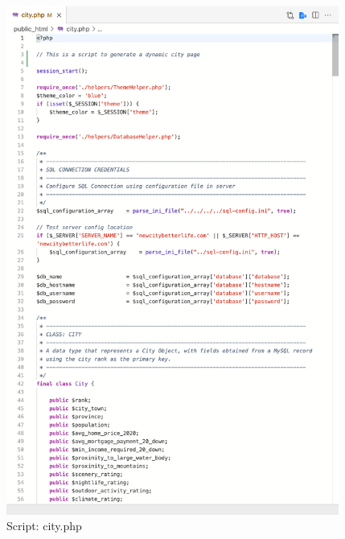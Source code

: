 \documentclass[12pt, letterpaper]{article}
\begin{document}
\begin{figure}[htbp]
	\centering
	\includegraphics[width=4.3in]{images/22-script-1.png}
	\caption{Script: city.php}
 \end{figure}

 
\end{document}
